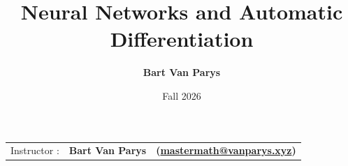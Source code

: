 \documentclass[9pt]{beamer}
\title[Continuous Optimization]{Neural Networks and Automatic Differentiation}
\author[]{\textbf{Bart Van Parys}}
\date[]{Fall 2026}
\begin{document}
\begin{frame}

  \maketitle

  \vspace{-2em}

    \begin{center}
    \begin{tabular}{lll}
      Instructor : & \textbf{Bart Van Parys} & \textbf{(\href{mailto:mastermath@vanparys.xyz}{mastermath@vanparys.xyz})} \\
    \end{tabular}
  \end{center}

\end{frame}
\end{document}
